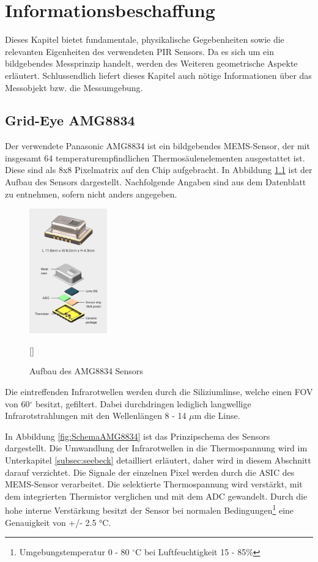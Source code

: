 \chapter{Informationsbeschaffung}
\label{chap:Informationsbeschaffung}
Dieses Kapitel bietet fundamentale, physikalische Gegebenheiten sowie die relevanten Eigenheiten des verwendeten \ac{PIR} Sensors. Da es sich um ein bildgebendes Messprinzip handelt, werden des Weiteren geometrische Aspekte erläutert. Schlussendlich liefert dieses Kapitel auch nötige Informationen über das Messobjekt bzw. die Messumgebung.

\section{Grid-Eye AMG8834}
\label{sec:AMG8834}

Der verwendete Panasonic AMG8834 ist ein bildgebendes \ac{MEMS}-Sensor, der mit insgesamt 64 temperaturempfindlichen Thermosäulenelementen ausgestattet ist. Diese sind als 8x8 Pixelmatrix auf den Chip aufgebracht. In Abbildung \ref{fig:Explosionsdarstellung} ist der Aufbau des Sensors dargestellt. Nachfolgende Angaben sind aus dem Datenblatt zu entnehmen, sofern nicht anders angegeben.
 
\begin{figure}[H]
	\centering
	\includegraphics[width=0.3\textwidth]
	{fig/grid_eye_aufbau.PNG}
	\caption[Aufbau des AMG8834 Sensors]{Aufbau des AMG8834 Sensors} [\protect\cite{AMG8834}]
	\label{fig:Explosionsdarstellung}
\end{figure}
Die eintreffenden Infrarotwellen werden durch die Siliziumlinse, welche einen \ac{FOV} von 60$^\circ$ besitzt, gefiltert. Dabei durchdringen lediglich langwellige Infrarotstrahlungen mit den Wellenlängen 8 - 14 $\mu$m die Linse. 

In Abbildung \ref{fig:SchemaAMG8834} ist das Prinzipschema des Sensors dargestellt. Die Umwandlung der Infrarotwellen in die Thermospannung wird im Unterkapitel \ref{subsec:seebeck} detailliert erläutert, daher wird in diesem Abschnitt darauf verzichtet. Die Signale der einzelnen Pixel werden durch die \ac{ASIC} des \ac{MEMS}-Sensor verarbeitet. Die selektierte Thermospannung wird verstärkt, mit dem integrierten Thermistor verglichen und mit dem \ac{ADC} gewandelt. Durch die hohe interne Verstärkung besitzt der Sensor bei normalen Bedingungen\footnote[1]{Umgebungstemperatur 0 - 80 $^\circ$C bei Luftfeuchtigkeit 15 - 85\%} eine Genauigkeit von +/- 2.5 °C. 

